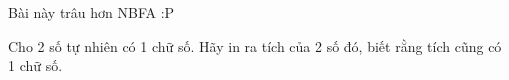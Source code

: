 Bài này trâu hơn NBFA :P  

   Cho 2 số tự nhiên có 1 chữ số. Hãy in ra tích của 2 số đó, biết rằng tích cũng có 1 chữ số.  

\